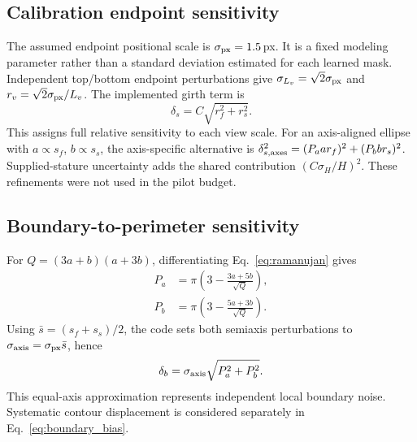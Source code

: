 \documentclass[11pt,a4paper]{article}
\numberwithin{equation}{section}
\begin{document}
\subsection{Calibration endpoint sensitivity}
The assumed endpoint positional scale is $\sigma_{\rm px}=1.5$\,px. It is a fixed modeling parameter rather than a standard deviation estimated for each learned mask. Independent top/bottom endpoint perturbations give $\sigma_{L_v}=\sqrt2\sigma_{\rm px}$ and $r_v=\sqrt2\sigma_{\rm px}/L_v$. The implemented girth term is
\begin{equation}
\delta_s=C\sqrt{r_f^2+r_s^2}.
\label{eq:scale_uncertainty_impl}
\end{equation}
This assigns full relative sensitivity to each view scale. For an axis-aligned ellipse with $a\propto s_f$, $b\propto s_s$, the axis-specific alternative is $\delta_{s,\rm axes}^2=(P_a a r_f)^2+(P_b b r_s)^2$. Supplied-stature uncertainty adds the shared contribution $(C\sigma_H/H)^2$. These refinements were not used in the pilot budget.

\subsection{Boundary-to-perimeter sensitivity}
For $Q=(3a+b)(a+3b)$, differentiating Eq.~\eqref{eq:ramanujan} gives
\begin{align}
P_a&=\pi\left(3-\frac{3a+5b}{\sqrt Q}\right),\label{eq:ramanujan_partial_a}\\
P_b&=\pi\left(3-\frac{5a+3b}{\sqrt Q}\right).\label{eq:ramanujan_partial_b}
\end{align}
Using $\bar s=(s_f+s_s)/2$, the code sets both semiaxis perturbations to $\sigma_{\rm axis}=\sigma_{\rm px}\bar s$, hence
\begin{equation}
\delta_b=\sigma_{\rm axis}\sqrt{P_a^2+P_b^2}.
\end{equation}
This equal-axis approximation represents independent local boundary noise. Systematic contour displacement is considered separately in Eq.~\eqref{eq:boundary_bias}.
\end{document}
